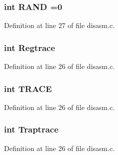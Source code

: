 \subsubsection[{R\+A\+ND}]{\setlength{\rightskip}{0pt plus 5cm}int R\+A\+ND =0}\label{disasm_8c_a189a26e268458e3db1ef6c84efa993d4}


Definition at line 27 of file disasm.\+c.

\subsubsection[{Regtrace}]{\setlength{\rightskip}{0pt plus 5cm}int Regtrace}\label{disasm_8c_a38daff3d696277a81716a8200f659a21}


Definition at line 26 of file disasm.\+c.

\subsubsection[{T\+R\+A\+CE}]{\setlength{\rightskip}{0pt plus 5cm}int T\+R\+A\+CE}\label{disasm_8c_a231cbc535bda364aa70c8d0617211a65}


Definition at line 26 of file disasm.\+c.

\subsubsection[{Traptrace}]{\setlength{\rightskip}{0pt plus 5cm}int Traptrace}\label{disasm_8c_a652034e5a9e2bb432b8f4c841d0834ab}


Definition at line 26 of file disasm.\+c.

